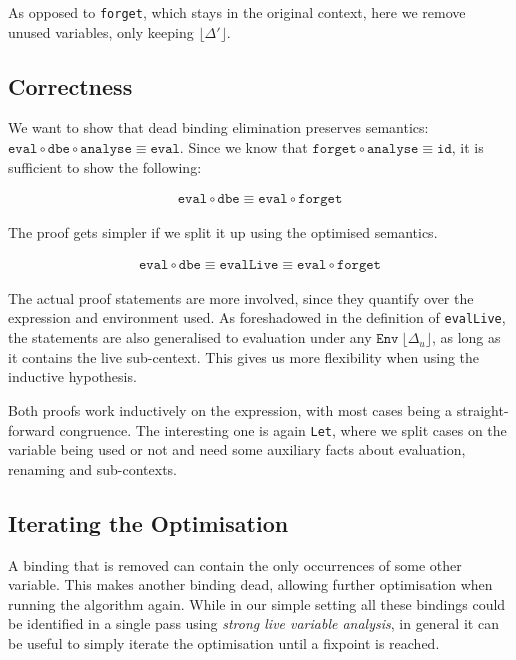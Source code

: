 \documentclass[sigplan,nonacm,screen]{acmart}
\newcommand{\I}[1]{\texttt{#1}\xspace}
\newcommand{\Floor}[1]{\lfloor #1 \rfloor\xspace}
\begin{document}
As opposed to \I{forget}, which stays in the original context,
here we remove unused variables, only keeping $\Floor{\Delta'}$.

\subsection{Correctness}

We want to show that dead binding elimination preserves semantics:
$\I{eval} \circ \I{dbe} \circ \I{analyse} \equiv \I{eval}$.
Since we know that $\I{forget} \circ \I{analyse} \equiv \I{id}$,
it is sufficient to show the following:

\begin{align*}
  \I{eval} \circ \I{dbe} \equiv \I{eval} \circ \I{forget}
\end{align*}

The proof gets simpler if we split it up using the optimised semantics.

\begin{align*}
  \I{eval} \circ \I{dbe} \equiv \I{evalLive} \equiv \I{eval} \circ \I{forget}
\end{align*}

The actual proof statements are more involved,
since they quantify over the expression and environment used.
As foreshadowed in the definition of \I{evalLive}, the statements are also generalised
to evaluation under any $\I{Env}\ \Floor{\Delta_u}$,
as long as it contains the live sub-centext.
This gives us more flexibility when using the inductive hypothesis.

Both proofs work inductively on the expression, with most cases being a straight-forward congruence.
The interesting one is again \I{Let}, where we split cases on the variable being used or not
and need some auxiliary facts about evaluation, renaming and sub-contexts.

\subsection{Iterating the Optimisation}

A binding that is removed can contain the only occurrences of some other variable.
This makes another binding dead, allowing further optimisation when running the algorithm again.
While in our simple setting all these bindings could be identified in a single pass
using \emph{strong live variable analysis},
in general it can be useful to simply iterate the optimisation until a fixpoint is reached.
\end{document}
